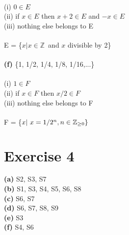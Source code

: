 \documentclass{article}
\begin{document}
\\
(i) $0 \in E$ \\ 
(ii) if $x \in E$ then $x+2 \in E$ and $-x \in E$ \\ 
(iii) nothing else belongs to E \\ 
\\
E = \{$x|x\in{} \mathbb{Z}$\ and $x$ divisible by 2\} \\
\\
\textbf{(f)} \{1, 1/2, 1/4, 1/8, 1/16,...\} \\
\\
(i) $1 \in F$ \\ 
(ii) if $x \in F$ then $x/2 \in F$  \\ 
(iii) nothing else belongs to F \\ 
\\
F = \{$x|\ x=1/2^n, n \in \mathbb{Z}_{\geq0}\} \\$
\\
\section{Exercise 4}

\textbf{(a)} S2, S3, S7\\
\textbf{(b)} S1, S3, S4, S5, S6, S8\\
\textbf{(c)} S6, S7\\
\textbf{(d)} S6, S7, S8, S9\\
\textbf{(e)} S3\\
\textbf{(f)} S4, S6\\

\newcommand{\R}{\mathbb{R}}
\end{document}
